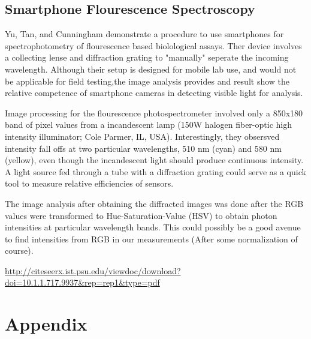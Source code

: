 \documentclass{article}
\begin{document}
\subsection{Smartphone Flourescence Spectroscopy}
Yu, Tan, and Cunningham demonstrate a procedure to use smartphones for
spectrophotometry of flourescence based biolological assays. Ther device
involves a collecting lense and diffraction grating to "manually" seperate
the incoming wavelength. Although their setup is designed for mobile lab use, and
would not be applicable for field testing,the image analysis provides and result show
the relative competence of smartphone cameras in detecting visible light for analysis.

Image processing for the flourescence photospectrometer involved only a 850x180 band of pixel
values from a incandescent lamp (150W halogen fiber-optic high intensity illuminator; Cole Parmer, IL, USA).
Interestingly, they obsersved intensity fall offs at two particular wavelengths, 510 nm (cyan) and 580 nm (yellow),
even though the incandescent light should produce continuous intensity. A light
source fed through a tube with a diffraction grating could serve as a quick tool to
measure relative efficiencies of sensors.

The image analysis after obtaining the diffracted images was done after the RGB values
were transformed to Hue-Saturation-Value (HSV) to obtain photon intensities at
particular wavelength bands. This could possibly be a good avenue to find intensities
from RGB in our measurements (After some normalization of course).


\url{http://citeseerx.ist.psu.edu/viewdoc/download?doi=10.1.1.717.9937&rep=rep1&type=pdf}


\section{Appendix}
\end{document}
